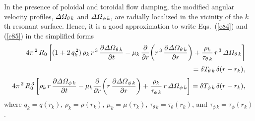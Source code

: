 \documentclass[12pt]{article}
\begin{document}
In the presence of poloidal and toroidal flow damping, the
modified angular velocity profiles,  ${\mit\Delta\Omega}_{\theta\,k}$ and 
${\mit\Delta\Omega}_{\phi\,k}$,  are radially localized in the
vicinity of the $k$th resonant surface. Hence, it is a
good approximation to write Eqs.~(\ref{e84}) and (\ref{e85}) in the simplified forms 
\begin{align}
 4\pi^{\,2}\,R_0\left[(1+2\,q_k^{\,2})\,\rho_k\,r^{\,3}\,\frac{\partial{\mit\Delta\Omega}_{\theta\,k}}{\partial t}-\mu_k\,\frac{\partial}{\partial r}\!\left(
r^{\,3}\,\frac{\partial{\mit\Delta\Omega}_{\theta\,k}}{\partial r}\right) +\frac{\rho_k}{\tau_{\theta\,k}}\,r^{\,3}\,{\mit\Delta\Omega}_{\theta\,k}\right]\nonumber\\[0.5ex]\phantom{==}=\delta T_{\theta\,k}\,\delta (r-r_k),\\[0.5ex]
 4\pi^{\,2}\,R_0^{\,3}\left[\rho_k\,r\,\frac{\partial{\mit\Delta\Omega}_{\phi\,k}}{\partial t}-\mu_k\frac{\partial}{\partial r}\!\left(
r\,\frac{\partial{\mit\Delta\Omega}_{\phi\,k}}{\partial r}\right) +\frac{\rho_k}{\tau_{\phi\,k}}\,r\,{\mit\Delta\Omega}_{\phi\,k}\right]
= \delta T_{\phi\,k}\,\delta(r-r_k),
\end{align}
where $q_k = q(r_k)$, $\rho_k=\rho(r_k)$, $\mu_k=\mu(r_k)$, $\tau_{\theta\,k}=\tau_\theta(r_k)$, and $\tau_{\phi\,k}=\tau_\phi(r_k)$. 
\end{document}
